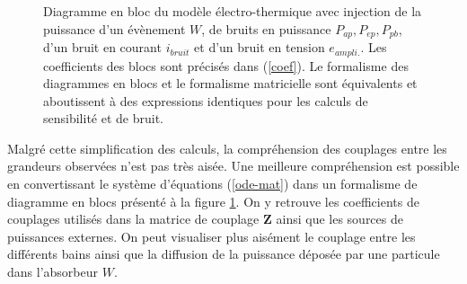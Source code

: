 \begin{figure}[!ht]
\begin{center}
\resizebox{\textwidth}{!}{%
\begin{tikzpicture}
	
\end{tikzpicture}
}%
\end{center}
\caption{Diagramme en bloc du modèle électro-thermique avec injection de la puissance d'un évènement $W$, de bruits en puissance $P_{ap}, P_{ep}, P_{pb}$, d'un bruit en courant $i_{bruit}$ et d'un bruit en tension $e_{ampli.}$. Les coefficients des blocs sont précisés dans (\ref{coef}). Le formalisme des diagrammes en blocs et le formalisme matricielle sont équivalents et aboutissent à des expressions identiques pour les calculs de sensibilité et de bruit.}
\label{block-diagram}
\end{figure}

Malgré cette simplification des calculs, la compréhension des couplages entre les grandeurs observées n'est pas très aisée. Une meilleure compréhension est possible en convertissant le système d'équations (\ref{ode-mat}) dans un formalisme de diagramme en blocs \cite{block-diagram} présenté à la figure \ref{block-diagram}. On y retrouve les coefficients de couplages utilisés dans la matrice de couplage $\bm{Z}$ ainsi que les sources de puissances externes. On peut visualiser plus aisément le couplage entre les différents bains ainsi que la diffusion de la puissance déposée par une particule dans l'absorbeur $W$.

